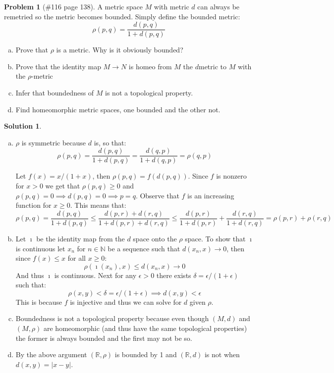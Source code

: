 \documentclass{article}
\theoremstyle{definition}
\newtheorem*{soln}{Solution}
\newtheorem*{prob}{Problem}
\theoremstyle{theorem}
\newcommand{\R}{\mathbb{R}}
\newcommand{\N}{\mathbb{N}}
\begin{document}
\vspace{1in}



\begin{prob}[\#116 page 138]
    A metric space $M$ with metric $d$ can always be remetried so the metric becomes bounded. Simply define the bounded metric:
    $$\rho(p,q) = \frac {d(p,q)}{1+ d(p,q)}$$
    \begin{enumerate}[(a)]
        \item Prove that $\rho$ is a metric. Why is it obviously bounded?
        \item Prove that the identity map $M\to N$ is homeo from $M$ the $d$metric to $M$ with the $\rho$-metric
        \item Infer that boundedness of $M$ is not a topological property.
        \item Find homeomorphic metric spaces, one bounded and the other not.
    \end{enumerate}
\end{prob}
\begin{soln}
    \begin{enumerate}[(a)]
        \item $\rho$ is symmetric because $d$ is, so that:
            $$\rho(p,q) =\frac {d(p,q)}{1+ d(p,q)} = \frac {d(q,p)}{1+ d(q,p)}=\rho(q,p) $$ 

            Let $f(x) = x/(1+x)$, then $\rho(p,q) = f(d(p,q))$. Since $f$ is nonzero for $x>0$ we get that $\rho(p,q)\geq 0$ and  $\rho(p,q)=0\implies d(p,q)=0\implies p=q$. Observe that $f$ is an increasing function for $x\geq 0$.  This means that:
            $$\rho(p,q) = \frac {d(p,q)}{1+ d(p,q)}\leq \frac {d(p,r)+ d(r,q)}{1+ d(p,r)+d(r,q)}\leq \frac {d(p,r)}{1+ d(p,r)}+\frac { d(r,q)}{1+d(r,q)} = \rho(p,r) + \rho(r,q) $$

        \item  Let $\imath$ be the identity map from the $d$ space onto the $\rho$ space. To show that $\imath$ is continuous let $x_n$ for $n\in \N$ be a sequence such that $d(x_n,x)\to 0$, then since $f(x)\leq x$ for all $x\geq 0$:
            $$\rho(\imath( x_n),x) \leq d(x_n,x) \to 0$$
            And thus $\imath $ is continuous. Next for any $\epsilon >0$ there exists $\delta = \epsilon/(1+\epsilon)$ such that:
            $$\rho(x,y)<\delta= \epsilon/(1+\epsilon) \implies d(x,y)<\epsilon$$
            This is because $f$ is injective and thus we can solve for $d$ given $\rho$.

        \item Boundedness is not a topological property because even though $(M,d)$ and $(M,\rho)$ are homeomorphic (and thus have the same topological properties) the former is always bounded and the first may not be so.
        \item By the above argument $(\R,\rho)$ is bounded by 1 and $(\R,d)$ is not when $d(x,y) =|x-y|$.
    \end{enumerate}
 
\end{soln}
\vspace{1in}
\end{document}
